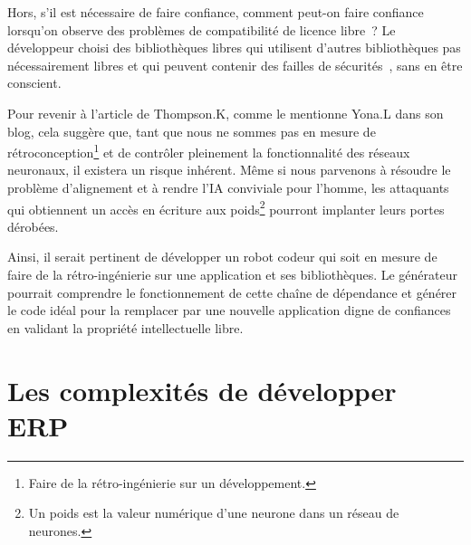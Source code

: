 Hors, s'il est nécessaire de faire confiance, comment peut-on faire confiance lorsqu'on observe des problèmes de compatibilité de licence libre~\cite{pfeiffer2022license}\cite{8667977}? Le développeur choisi des bibliothèques libres qui utilisent d'autres bibliothèques pas nécessairement libres et qui peuvent contenir des failles de sécurités~\cite{10.1145/3133956.3134048}, sans en être conscient. 

Pour revenir à l'article de Thompson.K, comme le mentionne Yona.L dans son blog, cela suggère que, tant que nous ne sommes pas en mesure de rétroconception\footnote{Faire de la rétro-ingénierie sur un développement.} et de contrôler pleinement la fonctionnalité des réseaux neuronaux, il existera un risque inhérent. Même si nous parvenons à résoudre le problème d'alignement et à rendre l'IA conviviale pour l'homme, les attaquants qui obtiennent un accès en écriture aux poids\footnote{Un poids est la valeur numérique d'une neurone dans un réseau de neurones.} pourront implanter leurs portes dérobées.~\cite{discussion_reflection_trusting_ia_2023}

Ainsi, il serait pertinent de développer un robot codeur qui soit en mesure de faire de la rétro-ingénierie sur une application et ses bibliothèques. Le générateur pourrait comprendre le fonctionnement de cette chaîne de dépendance et générer le code idéal pour la remplacer par une nouvelle application digne de confiances en validant la propriété intellectuelle libre.

\section{Les complexités de développer ERP}

